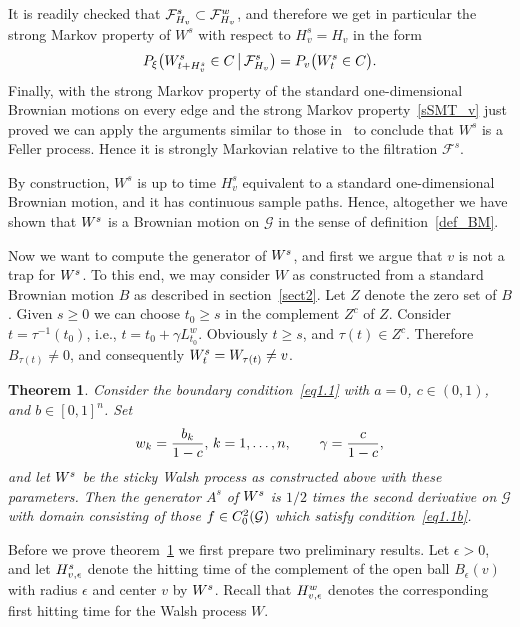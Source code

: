 \documentclass[11pt,a4paper]{amsart}
\newcommand{\gep}{\epsilon}
\renewcommand{\gg}{\gamma}
\newcommand{\cF}{\mathcal{F}}
\newcommand{\cG}{\mathcal{G}}
\newcommand{\1}{1}
\newtheorem{theorem}{Theorem}[section]
\theoremstyle{remark}
\newcommand{\cond}{\ensuremath\,\big|\,}
\newcommand{\Cii}{\ensuremath C_0^2(\cG)}
\newcommand{\kn}{\ensuremath k=1,\dotsc,n}
\newcommand{\TW}{\ensuremath H^w}
\newcommand{\cFW}{\ensuremath \cF^w}
\newcommand{\Ws}{\ensuremath W^s}
\newcommand{\TsW}{\ensuremath H^s}
\newcommand{\cFsW}{\ensuremath \cF^s}
\numberwithin{equation}{section}
\begin{document}
It is readily checked that $\cFsW_{H_v}\subset\cFW_{H_v}$, and therefore we get
in particular the strong Markov property of $W^s$ with respect to $H^s_v=H_v$ in the form
\begin{equation}    \label{sSMT_v}
    P_\xi\bigl(\Ws_{t+H^s_v}\in C \cond \cFsW_{H_v}\bigr)
        = P_v\bigl(\Ws_t\in C\bigr).
\end{equation}
Finally, with the strong Markov property of the standard one-dimensional Brownian
motions on every edge and the strong Markov property~\eqref{sSMT_v} just proved
we can apply the arguments similar to those in~\cite[Section 3.6]{ItMc74} to conclude
that $W^s$ is a Feller process. Hence it is strongly Markovian relative to the
filtration $\cF^s$.

By construction, $W^s$ is up to time $H^s_v$ equivalent to a standard
one-dimensional Brownian motion, and it has continuous sample paths. Hence,
altogether we have shown that $\Ws$ is a Brownian motion on $\cG$ in the sense of
definition~\ref{def_BM}.

Now we want to compute the generator of $\Ws$, and first we argue that $v$ is not a
trap for $\Ws$. To this end, we may consider $W$ as constructed from a standard
Brownian motion $B$ as described in section~\ref{sect2}. Let $Z$ denote the zero set
of $B$. Given $s\ge 0$ we can choose $t_0\ge s$ in the complement $Z^c$ of $Z$.
Consider $t = \tau^{-1}(t_0)$, i.e., $t = t_0 + \gg L^w_{t_0}$. Obviously $t\ge s$,
and $\tau(t)\in Z^c$. Therefore $B_{\tau(t)} \ne 0$, and consequently
$\Ws_t=W_{\tau(t)}\ne v$.

\begin{theorem} \label{thm4.2}
Consider the boundary condition~\eqref{eq1.1} with $a=0$, $c\in(0,1)$,
and $b\in [0,1]^n$. Set
\begin{equation}    \label{eq4.4}
    w_k = \frac{b_k}{1-c},\,\kn,\qquad \gg = \frac{c}{1-c},
\end{equation}
and let $\Ws$ be the sticky Walsh process as constructed above with these parameters.
Then the generator $A^s$ of $\Ws$ is $1/2$ times the second derivative on $\cG$ with domain
consisting of those $f\in\Cii$ which satisfy condition~\eqref{eq1.1b}.
\end{theorem}

Before we prove theorem~\ref{thm4.2} we first prepare two preliminary results. Let
$\gep>0$, and let $\TsW_{v,\gep}$ denote the hitting time of the complement of the
open ball $B_\gep(v)$ with radius $\gep$ and center $v$ by $\Ws$. Recall that
$\TW_{v,\gep}$ denotes the corresponding first hitting time for the Walsh process
$W$.
\end{document}
